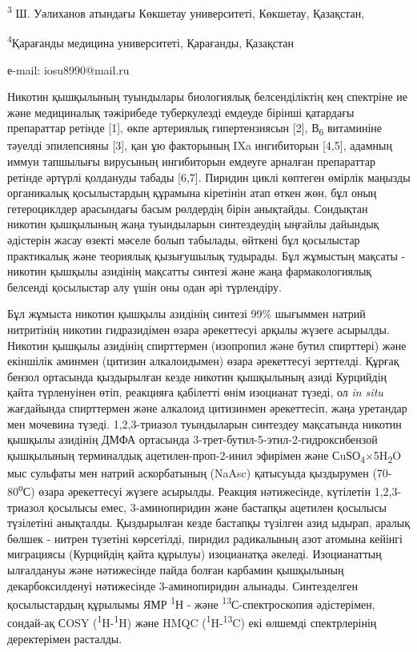\textsuperscript{3} Ш. Уәлиханов атындағы Көкшетау университеті,
Көкшетау, Қазақстан,

\textsuperscript{4}Қарағанды медицина университеті, Қарағанды, Қазақстан

е-mail: iosu8990@mail.ru

Никотин қышқылының туындылары биологиялық белсенділіктің кең спектріне
ие және медициналық тәжірибеде туберкулезді емдеуде бірінші қатардағы
препараттар ретінде {[}1{]}, өкпе артериялық гипертензиясын {[}2{]},
В\textsubscript{6} витаминіне тәуелді эпилепсияны {[}3{]}, қан ұю
факторының IXa ингибиторын {[}4,5{]}, адамның иммун тапшылығы вирусының
ингибиторын емдеуге арналған препараттар ретінде әртүрлі қолдануды
табады {[}6,7{]}. Пиридин циклі көптеген өмірлік маңызды органикалық
қосылыстардың құрамына кіретінін атап өткен жөн, бұл оның гетероциклдер
арасындағы басым рөлдердің бірін анықтайды. Сондықтан никотин қышқылының
жаңа туындыларын синтездеудің ыңғайлы дайындық әдістерін жасау өзекті
мәселе болып табылады, өйткені бұл қосылыстар практикалық және теориялық
қызығушылық тудырады. Бұл жұмыстың мақсаты - никотин қышқылы азидінің
мақсатты синтезі және жаңа фармакологиялық белсенді қосылыстар алу үшін
оны одан әрі түрлендіру.

Бұл жұмыста никотин қышқылы азидінің синтезі 99\% шығыммен натрий
нитритінің никотин гидразидімен өзара әрекеттесуі арқылы жүзеге
асырылды. Никотин қышқылы азидінің спирттермен (изопропил және бутил
спирттері) және екіншілік аминмен (цитизин алкалоидымен) өзара
әрекеттесуі зерттелді. Құрғақ бензол ортасында қыздырылған кезде никотин
қышқылының азиді Курцийдің қайта түрленуінен өтіп, реакцияға қабілетті
өнім изоцианат түзеді, ол \emph{in situ} жағдайында спирттермен және
алкалоид цитизинмен әрекеттесіп, жаңа уретандар мен мочевина түзеді.
1,2,3-триазол туындыларын синтездеу мақсатында никотин қышқылы азидінің
ДМФА ортасында 3-трет-бутил-5-этил-2-гидроксибензой қышқылының
терминалдық ацетилен-проп-2-инил эфирімен және
СuЅО\textsubscript{4}×5H\textsubscript{2}O мыс сульфаты мен натрий
аскорбатының (NaAsc) қатысуыда қыздырумен (70-80\textsuperscript{о}С)
өзара әрекеттесуі жүзеге асырылды. Реакция нәтижесінде, күтілетін
1,2,3-триазол қосылысы емес, 3-аминопиридин және бастапқы ацетилен
қосылысы түзілетіні анықталды. Қыздырылған кезде бастапқы түзілген азид
ыдырап, аралық бөлшек - нитрен түзетіні көрсетілді, пиридил радикалының
азот атомына кейінгі миграциясы (Курцийдің қайта құрылуы) изоцианатқа
әкеледі. Изоцианаттың ылғалдануы және нәтижесінде пайда болған карбамин
қышқылының декарбоксилденуі нәтижесінде 3-аминопиридин алынады.
Синтезделген қосылыстардың құрылымы ЯМР \textsuperscript{1}Н - және
\textsuperscript{13}С-спектроскопия әдістерімен, сондай-ақ СOSY
(\textsuperscript{1}H-\textsuperscript{1}H) және HMQC
(\textsuperscript{1}H-\textsuperscript{13}C) екі өлшемді спектрлерінің
деректерімен расталды.


